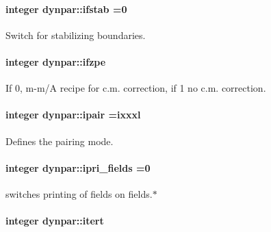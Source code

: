 \paragraph[{\texorpdfstring{ifstab}{ifstab}}]{\setlength{\rightskip}{0pt plus 5cm}integer dynpar\+::ifstab =0}\hypertarget{namespacedynpar_afab130173434abc128a531270a004014}{}\label{namespacedynpar_afab130173434abc128a531270a004014}


Switch for stabilizing boundaries. 

\paragraph[{\texorpdfstring{ifzpe}{ifzpe}}]{\setlength{\rightskip}{0pt plus 5cm}integer dynpar\+::ifzpe}\hypertarget{namespacedynpar_a775e5f5a73d95413b3060b3a3416d348}{}\label{namespacedynpar_a775e5f5a73d95413b3060b3a3416d348}


If 0, m-\/m/A recipe for c.\+m. correction, if 1 no c.\+m. correction. 

\paragraph[{\texorpdfstring{ipair}{ipair}}]{\setlength{\rightskip}{0pt plus 5cm}integer dynpar\+::ipair =ixxxl}\hypertarget{namespacedynpar_a121a312e57301749fe811c37a646ffa7}{}\label{namespacedynpar_a121a312e57301749fe811c37a646ffa7}


Defines the pairing mode. 

\paragraph[{\texorpdfstring{ipri\+\_\+fields}{ipri_fields}}]{\setlength{\rightskip}{0pt plus 5cm}integer dynpar\+::ipri\+\_\+fields =0}\hypertarget{namespacedynpar_a75d1d07f7bc1b403e24ec22b7fae69a9}{}\label{namespacedynpar_a75d1d07f7bc1b403e24ec22b7fae69a9}


switches printing of fields on \textquotesingle{}fields.$\ast$\textquotesingle{} 

\paragraph[{\texorpdfstring{itert}{itert}}]{\setlength{\rightskip}{0pt plus 5cm}integer dynpar\+::itert}\hypertarget{namespacedynpar_a5d684c8c5595bd94acfef2e7054d5cb8}{}\label{namespacedynpar_a5d684c8c5595bd94acfef2e7054d5cb8}


